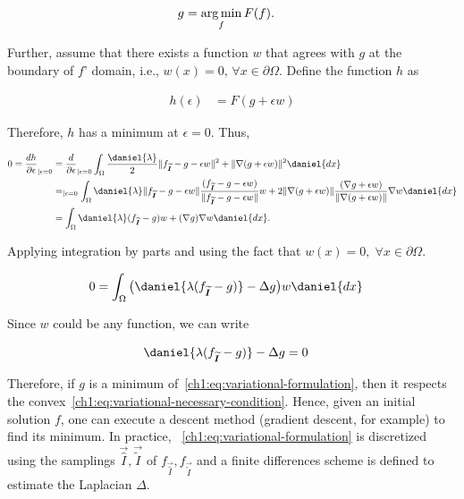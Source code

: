 \begin{align*}
	g &= \operatorname*{arg\,min}_{f}{F(f)}.
\end{align*}

Further, assume that there exists a function $w$ that agrees with $g$ at the boundary of $f$' domain, i.e., $w(x)=0,\, \forall x \in \partial \Omega$. Define the function $h$ as

\begin{align*}
	h(\epsilon) &= F(g+\epsilon w)
\end{align*}

Therefore, $h$ has a minimum at $\epsilon=0$. Thus,

\begin{align*}
	0 = \frac{dh}{\partial \epsilon}_{| \epsilon=0} &= \frac{d}{\partial \epsilon}_{| \epsilon=0} \int_{\Omega}{ \frac{\daniel{ \lambda }}{2}\norm{f_{\vec{\widetilde{I}}} - g - \epsilon w}^2 + \norm{ \nabla (g + \epsilon w) }^2 \daniel{dx}}  \\
	&= _{| \epsilon = 0} \int_{\Omega}{ \daniel{ \lambda }\norm{ f_{\vec{\widetilde{I}}} - g - \epsilon w}\frac{(f_{\vec{\widetilde{I}}} - g - \epsilon w) }{\norm{f_{\vec{\widetilde{I}}} - g - \epsilon w}}w + 2\norm{ \nabla (g + \epsilon w) }\frac{(\nabla g + \epsilon w)}{\norm{ \nabla (g + \epsilon w) }}\nabla w \daniel{dx}} \\
	&= \int_{\Omega}{ \daniel{ \lambda }(f_{\vec{\widetilde{I}}} - g)w + (\nabla g)\nabla w \daniel{dx}}. 	
\end{align*}

Applying integration by parts and using the fact that $w(x)=0,\; \forall x \in \partial \Omega$.

\begin{align*}
		0 &= \int_{\Omega}{ \big( \daniel{ \lambda ( f_{\vec{\widetilde{I}}} - g)} - \Delta g \big)w \daniel{dx}}
\end{align*}

Since $w$ could be any function, we can write

\begin{align}
	\daniel{ \lambda ( f_{\vec{\widetilde{I}}} - g)} - \Delta g &= 0
	\label{ch1:eq:variational-necessary-condition}
\end{align}


Therefore, if $g$ is a minimum of~\cref{ch1:eq:variational-formulation}, then it respects the convex~\cref{ch1:eq:variational-necessary-condition}. Hence, given an initial solution $f$, one can execute a descent method (gradient descent, for example) to find its minimum. In practice, ~\cref{ch1:eq:variational-formulation} is discretized using the samplings $\vec{\widehat{I}}, \vec{\widetilde{I}}$ of $f_{\vec{\widehat{I}}},f_{\vec{\widetilde{I}}}$ and a finite differences scheme is defined to estimate the Laplacian $\Delta$.

